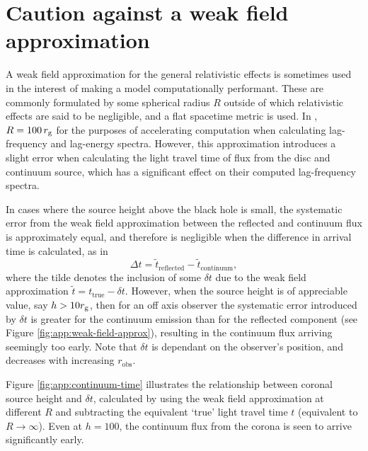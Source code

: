 \section{Caution against a weak field approximation}
\label{appendix:continuum-time}

A weak field approximation for the general relativistic effects is sometimes used in the interest of making a model computationally performant. These are commonly formulated by some spherical radius $R$ outside of which relativistic effects are said to be negligible, and a flat spacetime metric is used. In \cite{cackett_modelling_2014}, $R = 100\, r_\text{g}$ for the purposes of accelerating computation when calculating lag-frequency and lag-energy spectra. However, this approximation introduces a slight error when calculating the light travel time of flux from the disc and continuum source, which has a significant effect on their computed lag-frequency spectra.

In cases where the source height above the black hole is small, the systematic error from the weak field approximation between the reflected and continuum flux is approximately equal, and therefore is negligible when the difference in arrival time is calculated, as in
\begin{equation}
    \Delta t = \tilde{t}_\text{reflected} - \tilde{t}_\text{continuum} ,
\end{equation}
where the tilde denotes the inclusion of some $\delta t$ due to the weak field approximation $\tilde{t} = t_\text{true} - \delta t$. However, when the source height is of appreciable value, say $h > 10r_\text{g}$, then for an off axis observer the systematic error introduced by $\delta t$ is greater for the continuum emission than for the reflected component (see Figure \ref{fig:app:weak-field-approx}), resulting in the continuum flux arriving seemingly too early. Note that $\delta t$ is dependant on the observer's position, and decreases with increasing $r_\text{obs}$. 

Figure \ref{fig:app:continuum-time} illustrates the relationship between coronal source height and $\delta t$, calculated by using the weak field approximation at different $R$ and subtracting the equivalent `true' light travel time $t$ (equivalent to $R \rightarrow \infty$). Even at $h = 100$, the continuum flux from the corona is seen to arrive significantly early.

